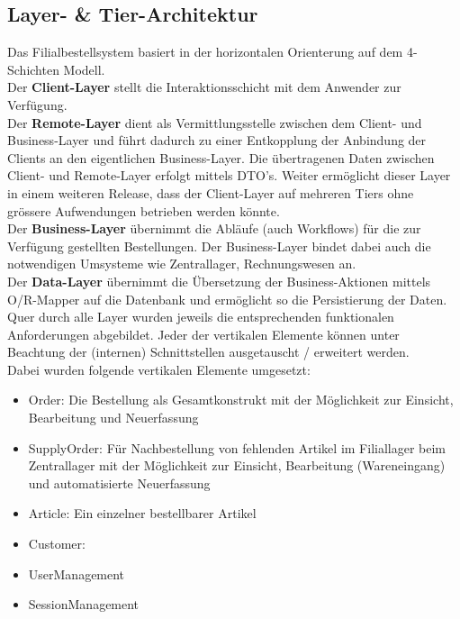 \clearpage
\subsection{Layer- \& Tier-Architektur}
Das Filialbestellsystem basiert in der horizontalen Orienterung auf dem 4-Schichten Modell. \\
Der \textbf{Client-Layer} stellt die Interaktionsschicht mit dem Anwender zur Verfügung.\\
Der \textbf{Remote-Layer} dient als Vermittlungsstelle zwischen dem Client- und Business-Layer und führt dadurch zu einer Entkopplung der Anbindung der Clients an den eigentlichen Business-Layer. Die übertragenen Daten zwischen Client- und Remote-Layer erfolgt mittels DTO's. Weiter ermöglicht dieser Layer in einem weiteren Release, dass der Client-Layer auf mehreren Tiers ohne grössere Aufwendungen betrieben werden könnte.\\
Der \textbf{Business-Layer} übernimmt die Abläufe (auch Workflows) für die zur Verfügung gestellten Bestellungen. Der Business-Layer bindet dabei auch die notwendigen Umsysteme wie Zentrallager, Rechnungswesen an.\\
Der \textbf{Data-Layer} übernimmt die Übersetzung der Business-Aktionen mittels O/R-Mapper auf die Datenbank und ermöglicht so die Persistierung der Daten.\\
Quer durch alle Layer wurden jeweils die entsprechenden funktionalen Anforderungen abgebildet. Jeder der vertikalen Elemente können unter Beachtung der (internen) Schnittstellen ausgetauscht / erweitert werden.\\
Dabei wurden folgende vertikalen Elemente umgesetzt:
\begin{itemize}
	\item Order: Die Bestellung als Gesamtkonstrukt mit der Möglichkeit zur Einsicht, Bearbeitung und Neuerfassung
	\item SupplyOrder: Für Nachbestellung von fehlenden Artikel im Filiallager beim Zentrallager mit der Möglichkeit zur Einsicht, Bearbeitung (Wareneingang) und automatisierte Neuerfassung
	\item Article: Ein einzelner bestellbarer Artikel 
	\item Customer:
	\item UserManagement
	\item SessionManagement
\end{itemize}

\clearpage
